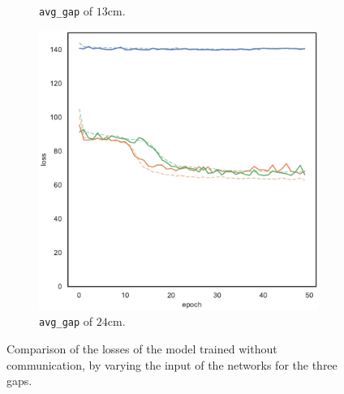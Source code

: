 \begin{figure}[!htb]
\begin{center}
\begin{subfigure}[h]{0.32\textwidth}
			\caption{\texttt{avg\_gap} of $13$\gls{cm}.}
		\end{subfigure}
		\hfill
		\begin{subfigure}[h]{0.32\textwidth}
			\includegraphics[width=\textwidth]{contents/images/task1-comm/loss-distributed-gap_24@copy}
			\caption{\texttt{avg\_gap} of $24$\gls{cm}.}
		\end{subfigure}
	\end{center}
	\vspace{-0.5cm}
	\caption[Losses summary of the first set of experiments (no 
	communication).]{Comparison of the losses of the model trained without 
		communication, by varying the input of the networks for the three gaps.}
	\label{fig:distlossgaps}
\end{figure}

